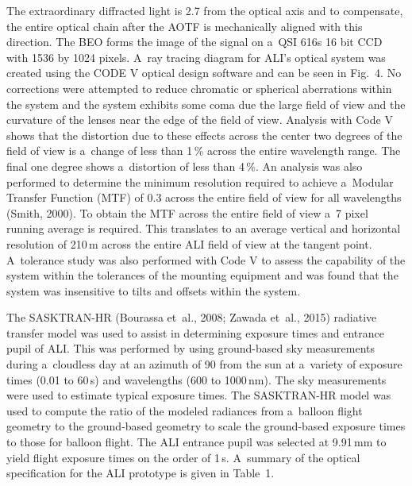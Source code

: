 \documentclass[amtd, online, hvmath]{copernicus}
\begin{document}
The extraordinary diffracted light is 2.7{\degree} from the optical
axis and to compensate, the entire optical chain after the AOTF is
mechanically aligned with this direction. The BEO forms the image of
the signal on a~QSI 616s 16 bit CCD with 1536 by 1024 pixels. A~ray
tracing diagram for ALI's optical system was created using the CODE V
optical design software and can be seen in Fig.~4. No corrections were
attempted to reduce chromatic or spherical aberrations within the
system and the system exhibits some coma due the large field of view
and the curvature of the lenses near the edge of the field of
view. Analysis with Code V shows that the distortion due to these
effects across the center two degrees of the field of view is a~change
of less than 1\,{\%} across the entire wavelength range. The
final one degree shows a~distortion of less than 4\,{\%}. An analysis
was also performed to determine the minimum resolution required to
achieve a~Modular Transfer Function (MTF) of 0.3 across the entire
field of view for all wavelengths (Smith, 2000). To obtain the MTF
across the entire field of view a~7 pixel running average is
required. This translates to an average vertical and horizontal
resolution of 210\,\unit{m} across the entire ALI field of view at the
tangent point. A~tolerance study was also performed with Code V to
assess the capability of the system within the tolerances of the
mounting equipment and was found that the system was insensitive to
tilts and offsets within the system.

The SASKTRAN-HR (Bourassa et~al., 2008; Zawada et~al., 2015) radiative
transfer model was used to assist in determining exposure times and
entrance pupil of ALI. This was performed by using ground-based sky
measurements during a~cloudless day at an azimuth of 90{\degree} from
the sun at a~variety of exposure times (0.01 to 60\,s) and wavelengths
(600 to 1000\,\unit{nm}). The sky measurements were used to estimate
typical exposure times. The SASKTRAN-HR model was used to compute the
ratio of the modeled radiances from a~balloon flight geometry to the
ground-based geometry to scale the ground-based exposure times to
those for balloon flight. The ALI entrance pupil was selected at
9.91\,\unit{mm} to yield flight exposure times on the order of
1\,s. A~summary of the optical specification for the ALI prototype is
given in Table~1.
\end{document}
